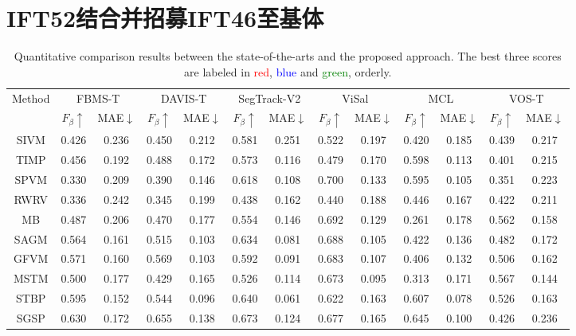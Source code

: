 \chapter{IFT52结合并招募IFT46至基体}
\renewcommand{\leftmark}{第五章\quad IFT52结合并招募IFT46至基体}
\begin{table}[]
\scriptsize
\center
\caption{Quantitative comparison results between the state-of-the-arts and the proposed approach. The best three scores are labeled in \textcolor{red}{red}, \textcolor{blue}{blue} and \textcolor{green}{green}, orderly.}
\begin{tabular}{|c|c|c|c|c|c|c|c|c|c|c|c|c|}
\hline
\multirow{2}{*}{Method} & \multicolumn{2}{c|}{FBMS-T} & \multicolumn{2}{c|}{DAVIS-T} & \multicolumn{2}{c|}{SegTrack-V2} & \multicolumn{2}{c|}{ViSal} & \multicolumn{2}{c|}{MCL} & \multicolumn{2}{c|}{VOS-T} \\ \cline{2-13}
 & $F_\beta\uparrow$ & MAE$\downarrow$ & $F_\beta\uparrow$ & MAE$\downarrow$ & $F_\beta\uparrow$ & MAE$\downarrow$ & $F_\beta\uparrow$ & MAE$\downarrow$ & $F_\beta\uparrow$ & MAE$\downarrow$ & $F_\beta\uparrow$ & MAE$\downarrow$ \\ \hline
SIVM & 0.426 & 0.236 & 0.450 & 0.212 & 0.581 & 0.251 & 0.522 & 0.197 & 0.420 & 0.185 & 0.439 & 0.217 \\ \hline
TIMP & 0.456 & 0.192 & 0.488 & 0.172 & 0.573 & 0.116 & 0.479 & 0.170 & 0.598 & 0.113 & 0.401 & 0.215 \\ \hline
SPVM & 0.330 & 0.209 & 0.390 & 0.146 & 0.618 & 0.108 & 0.700 & 0.133 & 0.595 & 0.105 & 0.351 & 0.223 \\ \hline
RWRV & 0.336 & 0.242 & 0.345 & 0.199 & 0.438 & 0.162 & 0.440 & 0.188 & 0.446 & 0.167 & 0.422 & 0.211 \\ \hline
MB & 0.487 & 0.206 & 0.470 & 0.177 & 0.554 & 0.146 & 0.692 & 0.129 & 0.261 & 0.178 & 0.562 & 0.158 \\ \hline
SAGM & 0.564 & 0.161 & 0.515 & 0.103 & 0.634 & 0.081 & 0.688 & 0.105 & 0.422 & 0.136 & 0.482 & 0.172 \\ \hline
GFVM & 0.571 & 0.160 & 0.569 & 0.103 & 0.592 & 0.091 & 0.683 & 0.107 & 0.406 & 0.132 & 0.506 & 0.162 \\ \hline
MSTM & 0.500 & 0.177 & 0.429 & 0.165 & 0.526 & 0.114 & 0.673 & 0.095 & 0.313 & 0.171 & 0.567 & 0.144 \\ \hline
STBP & 0.595 & 0.152 & 0.544 & 0.096 & 0.640 & 0.061 & 0.622 & 0.163 & 0.607 & 0.078 & 0.526 & 0.163 \\ \hline
SGSP & 0.630 & 0.172 & 0.655 & 0.138 & 0.673 & 0.124 & 0.677 & 0.165 & 0.645 & 0.100 & 0.426 & 0.236 \\ \hline

\end{tabular}
\end{table}

